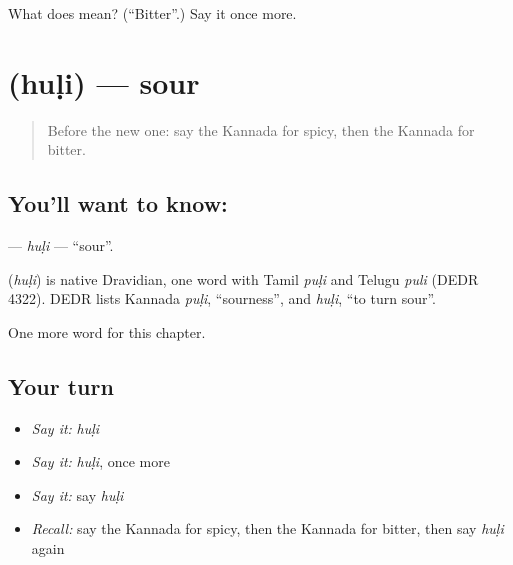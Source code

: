 \begin{tcolorbox}[breakable,colback=teal!4,colframe=teal!35!black,title={Before you move on}]
What does  mean? (\textquotedblleft{}Bitter\textquotedblright{}.) Say it once more.
\end{tcolorbox}
\section[\texorpdfstring{\kn{ಹುಳಿ} (huḷi)}{ಹುಳಿ (huḷi)}]{ (huḷi) — sour}

\label{lesson:KA-C145-huli2}



\begin{quote}
Before the new one: say the Kannada for spicy, then the Kannada for bitter.
\end{quote}

\subsection*{You'll want to know: }
\textbf{} — \emph{huḷi} — \textquotedblleft{}sour\textquotedblright{}.

\begin{cousinweb}
\textbf{} (\emph{huḷi}) is native Dravidian, one word with Tamil \emph{puḷi} and Telugu \emph{puli} (DEDR 4322). DEDR lists Kannada \emph{puḷi}, \textquotedblleft{}sourness\textquotedblright{}, and \emph{huḷi}, \textquotedblleft{}to turn sour\textquotedblright{}.
\end{cousinweb}

\begin{grammarlens}[title={What you've built}]
One more word for this chapter.
\end{grammarlens}

\subsection*{Your turn}
\begin{itemize}
\raggedright
  \item \emph{Say it:} \emph{huḷi}
  \item \emph{Say it:} \emph{huḷi}, once more
  \item \emph{Say it:} say \emph{huḷi}
  \item \emph{Recall:} say the Kannada for spicy, then the Kannada for bitter, then say \emph{huḷi} again
\end{itemize}

